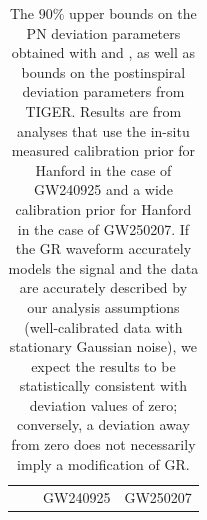 \begin{table}
\begin{ruledtabular}
    \caption{The $90\%$ upper bounds on the \ac{PN} deviation parameters obtained with  and , as well as bounds on the postinspiral deviation parameters from \ac{TIGER}.
	Results are from analyses that use the in-situ measured calibration prior for Hanford in the case of \ac{GW240925} and a wide calibration prior for Hanford in the case of \ac{GW250207}.
	If the \ac{GR} waveform accurately models the signal and the data are accurately described by our analysis assumptions (well-calibrated data with stationary Gaussian noise), we expect the results to be statistically consistent with deviation values of zero; conversely, a deviation away from zero does not necessarily imply a modification of \ac{GR}.
    }
    \label{table:FTI-TIGER}
    \renewcommand{\arraystretch}{1.2}
    {\begin{center}
    \begin{tabular}{c c c c c c}
    &  & \multicolumn{2}{c}{\ac{GW240925}} & \multicolumn{2}{c}{\ac{GW250207}} \\


\end{tabular}
\end{center}}
\end{ruledtabular}
\end{table}
